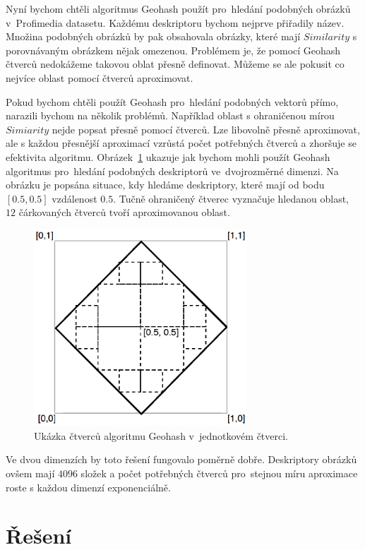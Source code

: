 Nyní bychom chtěli algoritmus Geohash použít pro~hledání podobných obrázků v~Profimedia datasetu. Každému deskriptoru bychom nejprve přiřadily název. Množina podobných obrázků by pak obsahovala obrázky, které mají $Similarity$ s porovnávaným obrázkem nějak omezenou. Problémem je, že pomocí Geohash čtverců nedokážeme takovou oblat přesně definovat. Můžeme se ale pokusit co nejvíce oblast pomocí čtverců aproximovat. 

Pokud bychom chtěli použít Geohash pro~hledání podobných vektorů přímo, narazili bychom na několik problémů. Například oblast s ohraničenou mírou $Simiarity$ nejde popsat přesně pomocí čtverců. Lze libovolně přesně aproximovat, ale s každou přesnější aproximací vzrůstá počet potřebných čtverců a zhoršuje se efektivita algoritmu. Obrázek~\ref{fig:geohash_use} ukazuje jak bychom mohli použít Geohash algoritmus pro~hledání podobných deskriptorů ve~dvojrozměrné dimenzi. Na obrázku je popsána situace, kdy hledáme deskriptory, které mají od bodu $[0.5, 0.5]$ vzdálenost $0.5$. Tučně ohraničený čtverec vyznačuje hledanou oblast, $12$ čárkovaných čtverců tvoří aproximovanou oblast.

\begin{figure}[h]
  \centering
  \includegraphics[width=80mm]{geohash_use.eps}
  \caption{Ukázka čtverců algoritmu Geohash v~jednotkovém čtverci.}
  \label{fig:geohash_use}
\end{figure}

Ve dvou dimenzích by toto řešení fungovalo poměrně dobře. Deskriptory obrázků ovšem mají $4096$ složek a počet potřebných čtverců pro~stejnou míru aproximace roste s každou dimenzí exponenciálně.

\section{Řešení}


